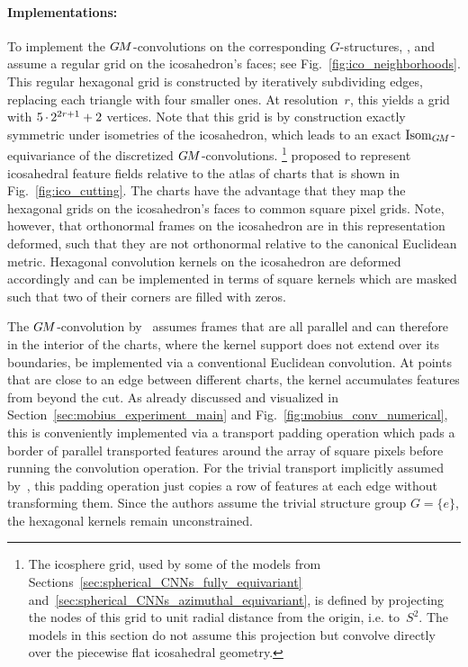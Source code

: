 \paragraph{Implementations:}
To implement the $G\mkern-1.4muM$-convolutions on the corresponding $G$-structures,
\citet{liu2018icoAltAz}, \citet{zhang2019orientation} and~\citet{gaugeIco2019}
assume a regular grid on the icosahedron's faces; see Fig.~\ref{fig:ico_neighborhoods}.
This regular hexagonal grid is constructed by iteratively subdividing edges, replacing each triangle with four smaller ones.
At resolution~$r$, this yields a grid with ${5\mkern-1mu\cdot\mkern-1mu 2^{2r+1} + 2}$ vertices.
Note that this grid is by construction exactly symmetric under isometries of the icosahedron, which leads to an exact $\operatorname{Isom}_{G\mkern-1.4muM}$-equivariance of the discretized $G\mkern-1.4muM$-convolutions.%
\footnote{
    The icosphere grid, used by some of the models from Sections~\ref{sec:spherical_CNNs_fully_equivariant} and~\ref{sec:spherical_CNNs_azimuthal_equivariant}, is defined by projecting the nodes of this grid to unit radial distance from the origin, i.e. to~$S^2$.
    The models in this section do not assume this projection but convolve directly over the piecewise flat icosahedral geometry.
}
\citet{liu2018icoAltAz} proposed to represent icosahedral feature fields relative to the atlas of charts that is shown in Fig.~\ref{fig:ico_cutting}.
The charts have the advantage that they map the hexagonal grids on the icosahedron's faces to common square pixel grids.
Note, however, that orthonormal frames on the icosahedron are in this representation deformed, such that they are not orthonormal relative to the canonical Euclidean metric.
Hexagonal convolution kernels on the icosahedron are deformed accordingly and can be implemented in terms of square kernels which are masked such that two of their corners are filled with zeros.


The $G\mkern-1.4muM$-convolution by~\citet{liu2018icoAltAz} assumes frames that are all parallel and can therefore in the interior of the charts, where the kernel support does not extend over its boundaries, be implemented via a conventional Euclidean convolution.
At points that are close to an edge between different charts, the kernel accumulates features from beyond the cut.
As already discussed and visualized in Section~\ref{sec:mobius_experiment_main} and Fig.~\ref{fig:mobius_conv_numerical}, this is conveniently implemented via a transport padding operation which pads a border of parallel transported features around the array of square pixels before running the convolution operation.
For the trivial transport implicitly assumed by~\citet{liu2018icoAltAz}, this padding operation just copies a row of features at each edge without transforming them.
Since the authors assume the trivial structure group $G=\{e\}$, the hexagonal kernels remain unconstrained.


